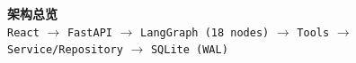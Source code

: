 \documentclass[10pt,a4paper]{ctexart}
\begin{document}
\vspace{4pt}
\begin{center}
\small
\textbf{架构总览}\\[2pt]
\texttt{React} $\rightarrow$ \texttt{FastAPI} $\rightarrow$ \texttt{LangGraph (18 nodes)} $\rightarrow$ \texttt{Tools} $\rightarrow$ \texttt{Service/Repository} $\rightarrow$ \texttt{SQLite (WAL)}
\end{center}
\end{document}
